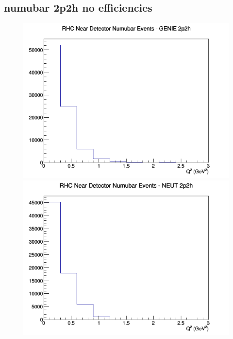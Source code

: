 \subsection{numubar 2p2h no efficiencies}
\begin{figure}[h]
\includegraphics[width=\linewidth]{Q2/nominal/2p2h_RHC_ND_numubar_Q2_GENIE.png}
\endminipage
{}
\includegraphics[width=\linewidth]{Q2/nominal/2p2h_RHC_ND_numubar_Q2_NEUT.png}
\endminipage
{}

\end{figure}
